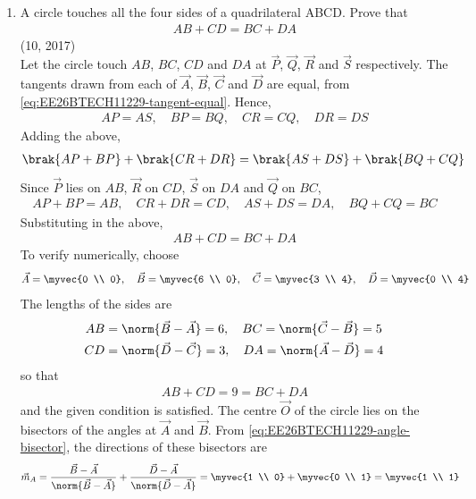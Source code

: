 \begin{enumerate}[label=\thesubsection.\arabic*, ref=\thesubsection.\theenumi]
\item 
A circle touches all the four sides of a quadrilateral ABCD. Prove that 
\begin{align*}
	AB + CD = BC + DA
\end{align*}
\hfill (10, 2017)
\\
\solution
Let the circle touch $AB$, $BC$, $CD$ and $DA$ at $\vec{P}$, $\vec{Q}$, $\vec{R}$ and $\vec{S}$ respectively. The tangents drawn from each of $\vec{A}$, $\vec{B}$, $\vec{C}$ and $\vec{D}$ are equal, from \eqref{eq:EE26BTECH11229-tangent-equal}. Hence,
\begin{align}
	AP = AS, \quad BP = BQ, \quad CR = CQ, \quad DR = DS
	\label{eq:EE26BTECH11229-Prob_5-1}
\end{align}
Adding the above,
\begin{align}
	\brak{AP + BP} + \brak{CR + DR} = \brak{AS + DS} + \brak{BQ + CQ}
\end{align}
Since $\vec{P}$ lies on $AB$, $\vec{R}$ on $CD$, $\vec{S}$ on $DA$ and $\vec{Q}$ on $BC$, 
\begin{align}
	AP + BP = AB, \quad CR + DR = CD, \quad AS + DS = DA, \quad BQ + CQ = BC
\end{align}
Substituting in the above,
\begin{align}
	AB + CD = BC + DA
\end{align}
To verify numerically, choose
\begin{align}
	\vec{A} = \myvec{0 \\ 0}, \quad \vec{B} = \myvec{6 \\ 0}, \quad \vec{C} = \myvec{3 \\ 4}, \quad \vec{D} = \myvec{0 \\ 4}
\end{align}
The lengths of the sides are
\begin{align}
	AB &= \norm{\vec{B}-\vec{A}} = 6, \quad BC = \norm{\vec{C}-\vec{B}} = 5
	\\
	CD &= \norm{\vec{D}-\vec{C}} = 3, \quad DA = \norm{\vec{A}-\vec{D}} = 4
\end{align}
so that
\begin{align}
	AB + CD = 9 = BC + DA
\end{align}
and the given condition is satisfied. The centre $\vec{O}$ of the circle lies on the bisectors of the angles at $\vec{A}$ and $\vec{B}$. From \eqref{eq:EE26BTECH11229-angle-bisector}, the directions of these bisectors are
\begin{align}
	\vec{m}_A &= \frac{\vec{B}-\vec{A}}{\norm{\vec{B}-\vec{A}}} + \frac{\vec{D}-\vec{A}}{\norm{\vec{D}-\vec{A}}} = \myvec{1 \\ 0} + \myvec{0 \\ 1} = \myvec{1 \\ 1}

\end{align}
\end{enumerate}

